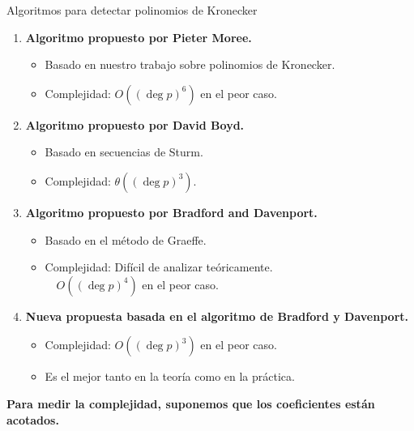 \documentclass[10pt,compress]{beamer}
\begin{document}
\begin{frame}{Algoritmos para detectar polinomios de Kronecker}
  
  \begin{enumerate}
  \item \textbf{Algoritmo propuesto por Pieter Moree.}
    \begin{itemize}
    \item Basado en nuestro trabajo sobre polinomios de Kronecker.
    \item Complejidad: $O((\deg p)^6)$ en el peor caso.
    \end{itemize}
  \item \textbf{Algoritmo propuesto por David Boyd.}
    \begin{itemize}
    \item Basado en secuencias de Sturm.
    \item Complejidad: $\theta((\deg p)^3)$.
    \end{itemize}
  \item \textbf{Algoritmo propuesto por Bradford and Davenport.}
    \begin{itemize}
    \item Basado en el método de Graeffe.
    \item Complejidad: Difícil de analizar teóricamente. \\ \qquad \qquad \quad \ \ $O((\deg p)^4)$ en el peor caso.
    \end{itemize}
  \item {\textbf{\color{TurkishRose}Nueva propuesta basada en el algoritmo de Bradford y
        Davenport.}}
    \begin{itemize}
    \item Complejidad: $O((\deg p)^3)$ en el peor caso.
    \item Es el mejor tanto en la teoría como en la práctica.
    \end{itemize}
  \end{enumerate}

  {\color{ChetwodeBlue}\textbf{Para medir la complejidad, suponemos que los coeficientes están acotados.}}
  \end{frame}
\end{document}
